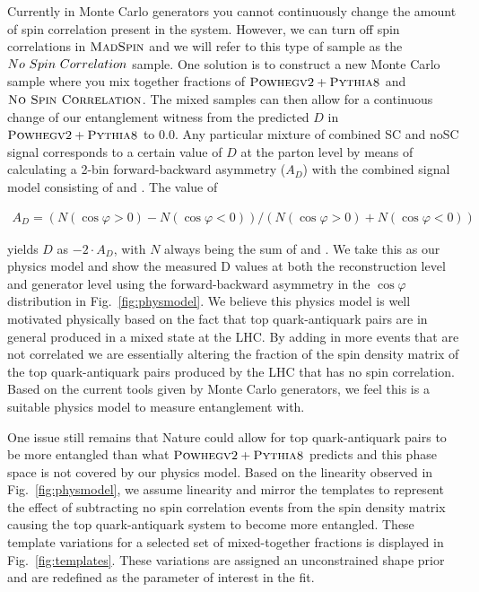 Currently in Monte Carlo generators you cannot continuously change the amount of spin correlation present in the \ttbar system. However, we can turn off spin correlations in ${\textsc{MadSpin}}$ and we will refer to this type of sample as the $\sc{No\ Spin\ Correlation}$ sample. One solution is to construct a new Monte Carlo sample where you mix together fractions of ${\textsc{Powhegv2}} + {\textsc{Pythia8}}$ and $\textsc{No\ Spin\ Correlation}$. The mixed samples can then allow for a continuous change of our entanglement witness from the predicted $D$ in ${\textsc{Powhegv2}} + {\textsc{Pythia8}}$ to $0.0$. Any particular mixture of combined SC and noSC signal corresponds to a certain value of $D$ at the parton level by means of calculating a 2-bin forward-backward asymmetry ($A_D$) with the combined signal model consisting of \ttbar and \etat. The value of 
\begin{linenomath}
   \begin{align}
      A_D = (N(\cos \varphi>0) - N(\cos \varphi <0)) / (N(\cos \varphi > 0) + N(\cos \varphi < 0))
   \end{align}
\end{linenomath}
yields $D$ as $-2 \cdot A_D$, with $N$ always being the sum of \ttbar and \etat. We take this as our physics model and show the measured D values at both the reconstruction level and generator level using the forward-backward asymmetry in the $\cos \varphi$ distribution in Fig.~\ref{fig:physmodel}. We believe this physics model is well motivated physically based on the fact that top quark-antiquark pairs are in general produced in a mixed state at the LHC. By adding in more events that are not correlated we are essentially altering the fraction of the spin density matrix of the top quark-antiquark pairs produced by the LHC that has no spin correlation. Based on the current tools given by Monte Carlo generators, we feel this is a suitable physics model to measure entanglement with.


One issue still remains that Nature could allow for top quark-antiquark pairs to be more entangled than what ${\textsc{Powhegv2}} + {\textsc{Pythia8}}$ predicts and this phase space is not covered by our physics model. Based on the linearity observed in Fig.~\ref{fig:physmodel}, we assume linearity and mirror the templates to represent the effect of subtracting no spin correlation events from the spin density matrix causing the top quark-antiquark system to become more entangled. These template variations for a selected set of mixed-together fractions is displayed in Fig.~\ref{fig:templates}. These variations are assigned an unconstrained shape prior and are redefined as the parameter of interest in the fit.

